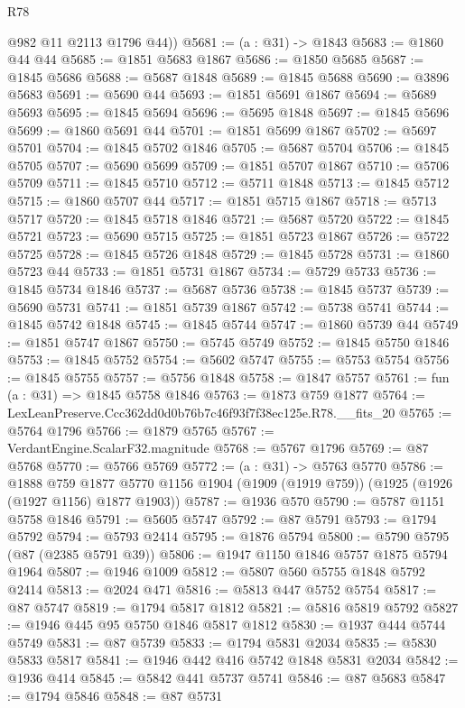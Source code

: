 \begin{lexlean}{R78}
\begin{coremodule}
        @982
        @11
        @2113
        @1796
        @44))
@5681 := (a : @31) -> @1843
@5683 := @1860 @44 @44
@5685 := @1851 @5683 @1867
@5686 := @1850 @5685
@5687 := @1845 @5686
@5688 := @5687 @1848
@5689 := @1845 @5688
@5690 := @3896 @5683
@5691 := @5690 @44
@5693 := @1851 @5691 @1867
@5694 := @5689 @5693
@5695 := @1845 @5694
@5696 := @5695 @1848
@5697 := @1845 @5696
@5699 := @1860 @5691 @44
@5701 := @1851 @5699 @1867
@5702 := @5697 @5701
@5704 := @1845 @5702 @1846
@5705 := @5687 @5704
@5706 := @1845 @5705
@5707 := @5690 @5699
@5709 := @1851 @5707 @1867
@5710 := @5706 @5709
@5711 := @1845 @5710
@5712 := @5711 @1848
@5713 := @1845 @5712
@5715 := @1860 @5707 @44
@5717 := @1851 @5715 @1867
@5718 := @5713 @5717
@5720 := @1845 @5718 @1846
@5721 := @5687 @5720
@5722 := @1845 @5721
@5723 := @5690 @5715
@5725 := @1851 @5723 @1867
@5726 := @5722 @5725
@5728 := @1845 @5726 @1848
@5729 := @1845 @5728
@5731 := @1860 @5723 @44
@5733 := @1851 @5731 @1867
@5734 := @5729 @5733
@5736 := @1845 @5734 @1846
@5737 := @5687 @5736
@5738 := @1845 @5737
@5739 := @5690 @5731
@5741 := @1851 @5739 @1867
@5742 := @5738 @5741
@5744 := @1845 @5742 @1848
@5745 := @1845 @5744
@5747 := @1860 @5739 @44
@5749 := @1851 @5747 @1867
@5750 := @5745 @5749
@5752 := @1845 @5750 @1846
@5753 := @1845 @5752
@5754 := @5602 @5747
@5755 := @5753 @5754
@5756 := @1845 @5755
@5757 := @5756 @1848
@5758 := @1847 @5757
@5761 := fun (a : @31) => @1845 @5758 @1846
@5763 := @1873 @759 @1877
@5764 := LexLeanPreserve.Ccc362dd0d0b76b7c46f93f7f38ec125e.R78.__fits_20
@5765 := @5764 @1796
@5766 := @1879 @5765
@5767 := VerdantEngine.ScalarF32.magnitude
@5768 := @5767 @1796
@5769 := @87 @5768
@5770 := @5766 @5769
@5772 := (a : @31) -> @5763 @5770
@5786 := @1888
    @759
    @1877
    @5770
    @1156
    @1904
    (@1909 (@1919 @759))
    (@1925 (@1926 (@1927 @1156) @1877 @1903))
@5787 := @1936 @570
@5790 := @5787 @1151 @5758 @1846
@5791 := @5605 @5747
@5792 := @87 @5791
@5793 := @1794 @5792
@5794 := @5793 @2414
@5795 := @1876 @5794
@5800 := @5790 @5795 (@87 (@2385 @5791 @39))
@5806 := @1947 @1150 @1846 @5757 @1875 @5794 @1964
@5807 := @1946 @1009
@5812 := @5807 @560 @5755 @1848 @5792 @2414
@5813 := @2024 @471
@5816 := @5813 @447 @5752 @5754
@5817 := @87 @5747
@5819 := @1794 @5817 @1812
@5821 := @5816 @5819 @5792
@5827 := @1946 @445 @95 @5750 @1846 @5817 @1812
@5830 := @1937 @444 @5744 @5749
@5831 := @87 @5739
@5833 := @1794 @5831 @2034
@5835 := @5830 @5833 @5817
@5841 := @1946 @442 @416 @5742 @1848 @5831 @2034
@5842 := @1936 @414
@5845 := @5842 @441 @5737 @5741
@5846 := @87 @5683
@5847 := @1794 @5846
@5848 := @87 @5731

\end{coremodule}
\end{lexlean}
